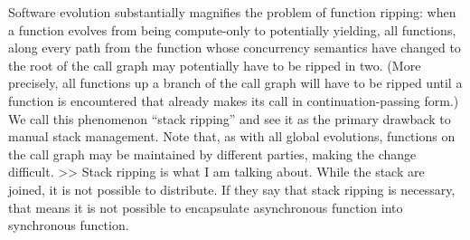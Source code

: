 Software evolution substantially magnifies the problem of function ripping: when a function evolves from being compute-only to potentially yielding, all functions, along every path from the function whose concurrency semantics have changed to the root of the call graph may potentially have to be ripped in two. (More precisely, all functions up a branch of the call graph will have to be ripped until a function is encountered that already makes its call in continuation-passing form.) We call this phenomenon ``stack ripping'' and see it as the primary drawback to manual stack management. Note that, as with all global evolutions, functions on the call graph may be maintained by different parties, making the change difficult. 
>> Stack ripping is what I am talking about.
   While the stack are joined, it is not possible to distribute.
   If they say that stack ripping is necessary, that means it is not possible to encapsulate asynchronous function into synchronous function.